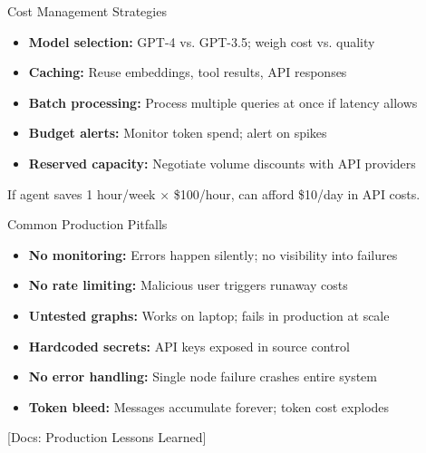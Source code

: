 \documentclass[aspectratio=169,11pt]{beamer}
\newcommand{\docref}[1]{{\scriptsize\color{docgray}[Docs: #1]}}
\begin{document}
\begin{frame}{Cost Management Strategies}
\setlength{\itemsep}{1pt}
\begin{itemize}
\item \textbf{Model selection:} GPT-4 vs. GPT-3.5; weigh cost vs. quality
\item \textbf{Caching:} Reuse embeddings, tool results, API responses
\item \textbf{Batch processing:} Process multiple queries at once if latency allows
\item \textbf{Budget alerts:} Monitor token spend; alert on spikes
\item \textbf{Reserved capacity:} Negotiate volume discounts with API providers
\end{itemize}
\vspace{0.15cm}
\begin{tipbox}
If agent saves 1 hour/week × \$100/hour, can afford \$10/day in API costs.
\end{tipbox}
\end{frame}

\begin{frame}{Common Production Pitfalls}
\setlength{\itemsep}{1pt}
\begin{itemize}
\item \textbf{No monitoring:} Errors happen silently; no visibility into failures
\item \textbf{No rate limiting:} Malicious user triggers runaway costs
\item \textbf{Untested graphs:} Works on laptop; fails in production at scale
\item \textbf{Hardcoded secrets:} API keys exposed in source control
\item \textbf{No error handling:} Single node failure crashes entire system
\item \textbf{Token bleed:} Messages accumulate forever; token cost explodes
\end{itemize}
\vspace{0.1cm}
\docref{Production Lessons Learned}
\end{frame}
\end{document}
